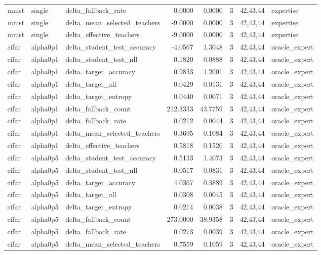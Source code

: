 \begin{tabular}{lllrrrll}
mnist & single & delta\_fallback\_rate & 0.0000 & 0.0000 & 3 & 42,43,44 & expertise \\
mnist & single & delta\_mean\_selected\_teachers & -9.0000 & 0.0000 & 3 & 42,43,44 & expertise \\
mnist & single & delta\_effective\_teachers & -9.0000 & 0.0000 & 3 & 42,43,44 & expertise \\
cifar & alpha0p1 & delta\_student\_test\_accuracy & -4.0567 & 1.3048 & 3 & 42,43,44 & oracle\_expert \\
cifar & alpha0p1 & delta\_student\_test\_nll & 0.1820 & 0.0888 & 3 & 42,43,44 & oracle\_expert \\
cifar & alpha0p1 & delta\_target\_accuracy & 0.9833 & 1.2001 & 3 & 42,43,44 & oracle\_expert \\
cifar & alpha0p1 & delta\_target\_nll & 0.0429 & 0.0131 & 3 & 42,43,44 & oracle\_expert \\
cifar & alpha0p1 & delta\_target\_entropy & 0.0440 & 0.0071 & 3 & 42,43,44 & oracle\_expert \\
cifar & alpha0p1 & delta\_fallback\_count & 212.3333 & 43.7759 & 3 & 42,43,44 & oracle\_expert \\
cifar & alpha0p1 & delta\_fallback\_rate & 0.0212 & 0.0044 & 3 & 42,43,44 & oracle\_expert \\
cifar & alpha0p1 & delta\_mean\_selected\_teachers & 0.3695 & 0.1084 & 3 & 42,43,44 & oracle\_expert \\
cifar & alpha0p1 & delta\_effective\_teachers & 0.5818 & 0.1520 & 3 & 42,43,44 & oracle\_expert \\
cifar & alpha0p5 & delta\_student\_test\_accuracy & 0.5133 & 1.4073 & 3 & 42,43,44 & oracle\_expert \\
cifar & alpha0p5 & delta\_student\_test\_nll & -0.0517 & 0.0831 & 3 & 42,43,44 & oracle\_expert \\
cifar & alpha0p5 & delta\_target\_accuracy & 4.0367 & 0.3889 & 3 & 42,43,44 & oracle\_expert \\
cifar & alpha0p5 & delta\_target\_nll & 0.0308 & 0.0045 & 3 & 42,43,44 & oracle\_expert \\
cifar & alpha0p5 & delta\_target\_entropy & 0.0214 & 0.0038 & 3 & 42,43,44 & oracle\_expert \\
cifar & alpha0p5 & delta\_fallback\_count & 273.0000 & 38.9358 & 3 & 42,43,44 & oracle\_expert \\
cifar & alpha0p5 & delta\_fallback\_rate & 0.0273 & 0.0039 & 3 & 42,43,44 & oracle\_expert \\
cifar & alpha0p5 & delta\_mean\_selected\_teachers & 0.7559 & 0.1059 & 3 & 42,43,44 & oracle\_expert \\

\end{tabular}
